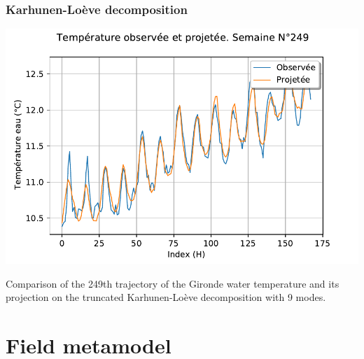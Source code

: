 \documentclass[10pt]{beamer}
\begin{document}

\begin{frame}
\frametitle{Karhunen-Loève decomposition}

\begin{center}
\includegraphics[height=0.6\textheight]{figures/decompositionKL-1H-comparaison-249.pdf}
\end{center}

Comparison of the 249th trajectory of the Gironde water temperature 
and its projection on the truncated Karhunen-Loève decomposition with 9 modes. 

\end{frame}


\section{Field metamodel}


\end{document}

